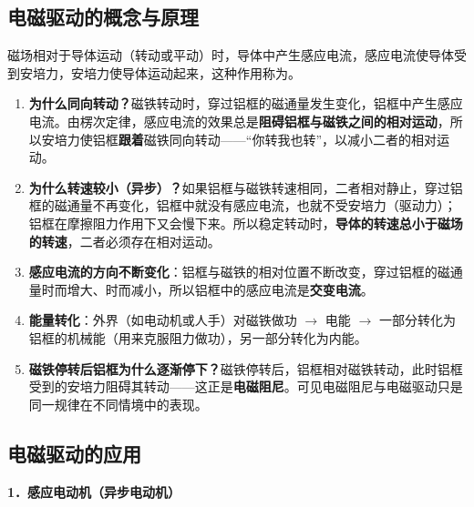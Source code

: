 \subsection{电磁驱动的概念与原理}

\begin{zhishi}[电磁驱动]
磁场相对于导体运动（转动或平动）时，导体中产生感应电流，感应电流使导体受到安培力，安培力使导体运动起来，这种作用称为。
\end{zhishi}

\begin{enumerate}[label=（\arabic*）,leftmargin=2.6em]
  \item \textbf{为什么同向转动？}磁铁转动时，穿过铝框的磁通量发生变化，铝框中产生感应电流。由楞次定律，感应电流的效果总是\textbf{阻碍铝框与磁铁之间的相对运动}，所以安培力使铝框\textbf{跟着}磁铁同向转动——“你转我也转”，以减小二者的相对运动。
  \item \textbf{为什么转速较小（异步）？}如果铝框与磁铁转速相同，二者相对静止，穿过铝框的磁通量不再变化，铝框中就没有感应电流，也就不受安培力（驱动力）；铝框在摩擦阻力作用下又会慢下来。所以稳定转动时，\textbf{导体的转速总小于磁场的转速}，二者必须存在相对运动。
  \item \textbf{感应电流的方向不断变化}：铝框与磁铁的相对位置不断改变，穿过铝框的磁通量时而增大、时而减小，所以铝框中的感应电流是\textbf{交变电流}。
  \item \textbf{能量转化}：外界（如电动机或人手）对磁铁做功 $\to$ 电能 $\to$ 一部分转化为铝框的机械能（用来克服阻力做功），另一部分转化为内能。
  \item \textbf{磁铁停转后铝框为什么逐渐停下？}磁铁停转后，铝框相对磁铁转动，此时铝框受到的安培力阻碍其转动——这正是\textbf{电磁阻尼}。可见电磁阻尼与电磁驱动只是同一规律在不同情境中的表现。
\end{enumerate}

\subsection{电磁驱动的应用}

\noindent\textbf{1．感应电动机（异步电动机）}

